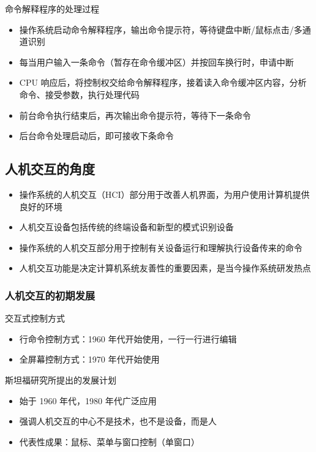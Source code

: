\documentclass[cs4size,a4paper,10pt]{ctexart}
\begin{document}
		命令解释程序的处理过程
		\begin{itemize}
			\item 操作系统启动命令解释程序，输出命令提示符，等待键盘中断/鼠标点击/多通道识别
			\item 每当用户输入一条命令（暂存在命令缓冲区）并按回车换行时，申请中断
			\item CPU 响应后，将控制权交给命令解释程序，接着读入命令缓冲区内容，分析命令、接受参数，执行处理代码
			\item 前台命令执行结束后，再次输出命令提示符，等待下一条命令
			\item 后台命令处理启动后，即可接收下条命令
		\end{itemize}


		\subsection{人机交互的角度}
		\begin{itemize}
			\item 操作系统的人机交互（HCI）部分用于改善人机界面，为用户使用计算机提供良好的环境
			\item 人机交互设备包括传统的终端设备和新型的模式识别设备
			\item 操作系统的人机交互部分用于控制有关设备运行和理解执行设备传来的命令
			\item 人机交互功能是决定计算机系统友善性的重要因素，是当今操作系统研发热点
		\end{itemize}
		\subsubsection{人机交互的初期发展}
		交互式控制方式
		\begin{itemize}
			\item 行命令控制方式：1960 年代开始使用，一行一行进行编辑
			\item 全屏幕控制方式：1970 年代开始使用
		\end{itemize}
		斯坦福研究所提出的发展计划
		\begin{itemize}
			\item 始于 1960 年代，1980 年代广泛应用
			\item 强调人机交互的中心不是技术，也不是设备，而是人
			\item 代表性成果：鼠标、菜单与窗口控制（单窗口）
		\end{itemize}
\end{document}
